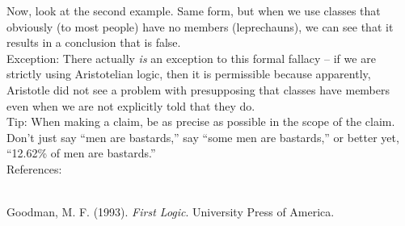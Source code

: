\documentclass[a4paper,12pt,single,pdftex]{scrartcl}
\begin{document}
    
      Now, look at the second example.  Same form, but when we use classes that obviously (to most people) have no members (leprechauns), we can see that it results in a conclusion that is false. 
    \\

    
      Exception: There actually {\it is} an exception to this formal fallacy -- if we are strictly using Aristotelian logic, then it is permissible because apparently, Aristotle did not see a problem with presupposing that classes have members even when we are not explicitly told that they do.
    \\

    
      Tip: When making a claim, be as precise as possible in the scope of the claim. Don’t just say “men are bastards,” say “some men are bastards,” or better yet, “12.62\% of men are bastards.”
    \\

    References:

    
      
        
      \\

      
        
          Goodman, M. F. (1993). {\it First Logic}. University Press of America.
        
      
    
\end{document}

